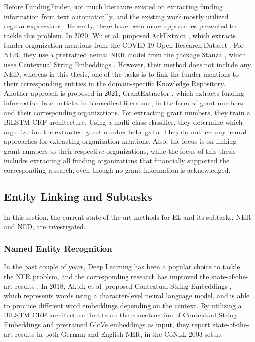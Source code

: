 \documentclass{article}
\theoremstyle{definition}
\theoremstyle{remark}
\begin{document}
    Before FundingFinder, not much literature existed on extracting funding information from text automatically, and the existing work mostly utilized regular expressions \cite{ElsPaper}. Recently, there have been more approaches presented to tackle this problem. In 2020, Wu et al. proposed AckExtract  \cite{AckExtract}, which extracts funder organization mentions from the COVID-19 Open Research Dataset \cite{CORD}. For NER, they use a pretrained neural NER model from the package Stanza \cite{stanza}, which uses Contextual String Embeddings \cite{flairpaper}. However, their method does not include any NED, whereas in this thesis, one of the tasks is to link the funder mentions to their corresponding entities in the domain-specific Knowledge Repository. Another approach is proposed in 2021, GrantExtractor \cite{GrantExtractor}, which extracts funding information from articles in biomedical literature, in the form of grant numbers and their corresponding organizations. For extracting grant numbers, they train a BiLSTM-CRF \cite{BiLSTMCRF} architecture. Using a multi-class classifier, they determine which organization the extracted grant number belongs to. They do not use any neural approaches for extracting organization mentions. Also, the focus is on linking grant numbers to their respective organizations, while the focus of this thesis includes extracting all funding organizations that financially supported the corresponding research, even though no grant information is acknowledged.

\subsection{Entity Linking and Subtasks}
\label{sota}
In this section, the current state-of-the-art methods for EL and its subtasks, NER and NED, are investigated.
\subsubsection{Named Entity Recognition}
In the past couple of years, Deep Learning has been a popular choice to tackle the NER problem, and the corresponding research has improved the state-of-the-art results \cite{NERsurvey}. In 2018, Akbik et al. proposed Contextual String Embeddings \cite{flairpaper}, which represents words using a character-level neural language model, and is able to produce different word embeddings depending on the context. By utilizing a BiLSTM-CRF architecture that takes the concatenation of Contextual String Embeddings and pretrained GloVe embeddings \cite{glove} as input, they report state-of-the-art results in both German and English NER, in the CoNLL-2003 \cite{conll} setup. 
\end{document}

